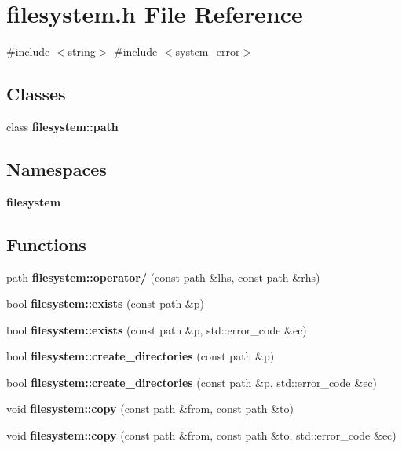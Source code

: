 \section{filesystem.\+h File Reference}
\label{filesystem_8h}
{\ttfamily \#include $<$string$>$}\newline
{\ttfamily \#include $<$system\+\_\+error$>$}\newline
\subsection*{Classes}
\begin{DoxyCompactItemize}
\item 
class \textbf{ filesystem\+::path}
\end{DoxyCompactItemize}
\subsection*{Namespaces}
\begin{DoxyCompactItemize}
\item 
 \textbf{ filesystem}
\end{DoxyCompactItemize}
\subsection*{Functions}
\begin{DoxyCompactItemize}
\item 
path \textbf{ filesystem\+::operator/} (const path \&lhs, const path \&rhs)
\item 
bool \textbf{ filesystem\+::exists} (const path \&p)
\item 
bool \textbf{ filesystem\+::exists} (const path \&p, std\+::error\+\_\+code \&ec)
\item 
bool \textbf{ filesystem\+::create\+\_\+directories} (const path \&p)
\item 
bool \textbf{ filesystem\+::create\+\_\+directories} (const path \&p, std\+::error\+\_\+code \&ec)
\item 
void \textbf{ filesystem\+::copy} (const path \&from, const path \&to)
\item 
void \textbf{ filesystem\+::copy} (const path \&from, const path \&to, std\+::error\+\_\+code \&ec)
\end{DoxyCompactItemize}
